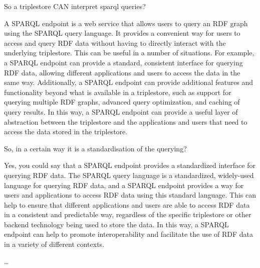 \begin{description}
	\me So a triplestore CAN interpret sparql queries?

	\gpt A SPARQL endpoint is a web service that allows users to query an RDF graph using the SPARQL query language. It provides a convenient way for users to access and query RDF data without having to directly interact with the underlying triplestore. This can be useful in a number of situations. For example, a SPARQL endpoint can provide a standard, consistent interface for querying RDF data, allowing different applications and users to access the data in the same way. Additionally, a SPARQL endpoint can provide additional features and functionality beyond what is available in a triplestore, such as support for querying multiple RDF graphs, advanced query optimization, and caching of query results. In this way, a SPARQL endpoint can provide a useful layer of abstraction between the triplestore and the applications and users that need to access the data stored in the triplestore.

	\me So, in a certain way it is a standardisation of the querying?

	\gpt Yes, you could say that a SPARQL endpoint provides a standardized interface for querying RDF data. The SPARQL query language is a standardized, widely-used language for querying RDF data, and a SPARQL endpoint provides a way for users and applications to access RDF data using this standard language. This can help to ensure that different applications and users are able to access RDF data in a consistent and predictable way, regardless of the specific triplestore or other backend technology being used to store the data. In this way, a SPARQL endpoint can help to promote interoperability and facilitate the use of RDF data in a variety of different contexts.

	\dots
\end{description}